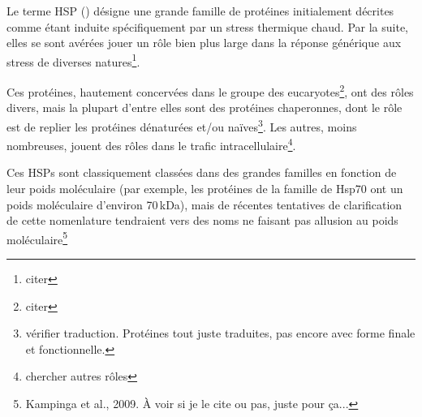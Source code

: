 \cite{federhoffmann1999, zhang2011}

Le terme HSP () désigne une grande famille de
protéines initialement décrites comme étant induite spécifiquement par un
stress thermique chaud. Par la suite, elles se sont avérées jouer un rôle bien
plus large dans la réponse générique aux stress de diverses
natures\footnote{citer}.


Ces protéines, hautement concervées dans le groupe des
eucaryotes\footnote{citer}, ont des rôles divers, mais la plupart d'entre
elles sont des protéines chaperonnes, dont le rôle est de replier les
protéines dénaturées et/ou naïves\footnote{vérifier traduction. Protéines tout
juste traduites, pas encore avec forme finale et fonctionnelle.}. Les autres,
moins nombreuses, jouent des rôles dans le trafic
intracellulaire\footnote{chercher autres rôles}.



Ces HSPs sont classiquement classées dans des grandes familles en fonction de
leur poids moléculaire (par exemple, les protéines de la famille de Hsp70 ont
un poids moléculaire d'environ 70\,kDa), mais de récentes tentatives de
clarification de cette nomenlature tendraient vers des noms ne faisant pas
allusion au poids moléculaire\footnote{Kampinga et al., 2009. À voir si je le
cite ou pas, juste pour ça...}



